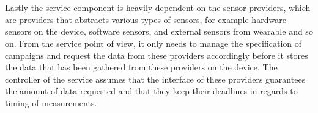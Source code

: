 \\\\
Lastly the service component is heavily dependent on the sensor providers, which are providers that abstracts various types of sensors, for example hardware sensors on the device, software sensors, and external sensors from wearable and so on. From the service point of view, it only needs to manage the specification of campaigns and request the data from these providers accordingly before it stores the data that has been gathered from these providers on the device. The controller of the service assumes that the interface of these providers guarantees the amount of data requested and that they keep their deadlines in regards to timing of measurements.